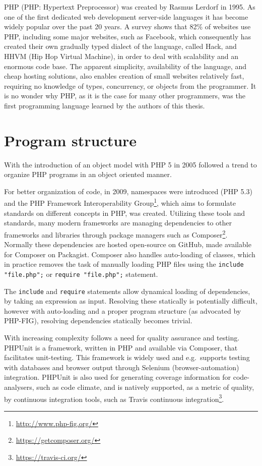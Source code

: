 PHP (PHP: Hypertext Preprocessor) was created by Rasmus Lerdorf in 1995. As one of the first dedicated web development server-side languages it has become widely popular over the past 20 years. A survey shows that 82\% of websites use PHP, including some major websites, such as Facebook, which consequently has created their own gradually typed dialect of the language, called Hack, and HHVM (Hip Hop Virtual Machine), in order to deal with scalability and an enormous code base. The apparent simplicity, availability of the language, and cheap hosting solutions,  also enables creation of small websites relatively fast, requiring no knowledge of types, concurrency, or objects from the programmer. It is no wonder why PHP, as it is the case for many other programmers, was the first programming language learned by the authors of this thesis.

\section{Program structure}
\label{sec:bgProgStuc}
With the introduction of an object model with PHP 5 in 2005 followed a trend to organize PHP programs in an object oriented manner. 

For better organization of code, in 2009, namespaces were introduced (PHP 5.3) and the PHP Framework Interoperability Group\footnote{\url{http://www.php-fig.org/}}, which aims to formulate standards on different concepts in PHP, was created. Utilizing these tools and standards, many modern frameworks are managing dependencies to other frameworks and libraries through package managers such as Composer\footnote{\url{https://getcomposer.org/}}. Normally these dependencies are hosted open-source on GitHub, made available for Composer on Packagist. Composer also handles auto-loading of classes, which in practice removes the task of manually loading PHP files using the \texttt{include "file.php";} or \texttt{require "file.php";} statement. 

The \texttt{include} and \texttt{require} statements allow dynamical loading of dependencies, by taking an expression as input. Resolving these statically is potentially difficult, however with auto-loading and a proper program structure (as advocated by PHP-FIG), resolving dependencies statically becomes trivial.

With increasing complexity follows a need for quality assurance and testing. PHPUnit is a framework, written in PHP and available via Composer, that facilitates unit-testing. This framework is widely used and e.g.\ supports testing with databases and browser output through Selenium (browser-automation) integration. PHPUnit is also used for generating coverage information for code-analysers, such as code climate, and is natively supported, as a metric of quality, by continuous integration tools, such as Travis continuous integration\footnote{\url{https://travis-ci.org/}}. 

